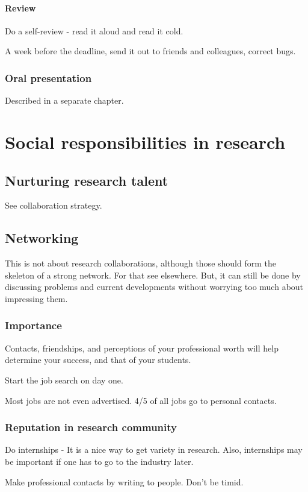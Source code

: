 \documentclass[oneside, article]{memoir}
\begin{document}
\subsection{Review}
Do a self-review - read it aloud and read it cold.

A week before the deadline, send it out to friends and colleagues, correct bugs.

\section{Oral presentation}
Described in a separate chapter.

\part{Social responsibilities in research}
\chapter{Nurturing research talent}
See collaboration strategy.

\chapter{Networking}
This is not about research collaborations, although those should form the skeleton of a strong network. For that see elsewhere. But, it can still be done by discussing problems and current developments without worrying too much about impressing them.

\section{Importance}
Contacts, friendships, and perceptions of your professional worth will help determine your success, and that of your students.

Start the job search on day one.

Most jobs are not even advertised. 4/5 of all jobs go to personal contacts.

\section{Reputation in research community}
Do internships - It is a nice way to get variety in research. Also, internships may be important if one has to go to the industry later.

Make professional contacts by writing to people. Don't be timid.
\end{document}
